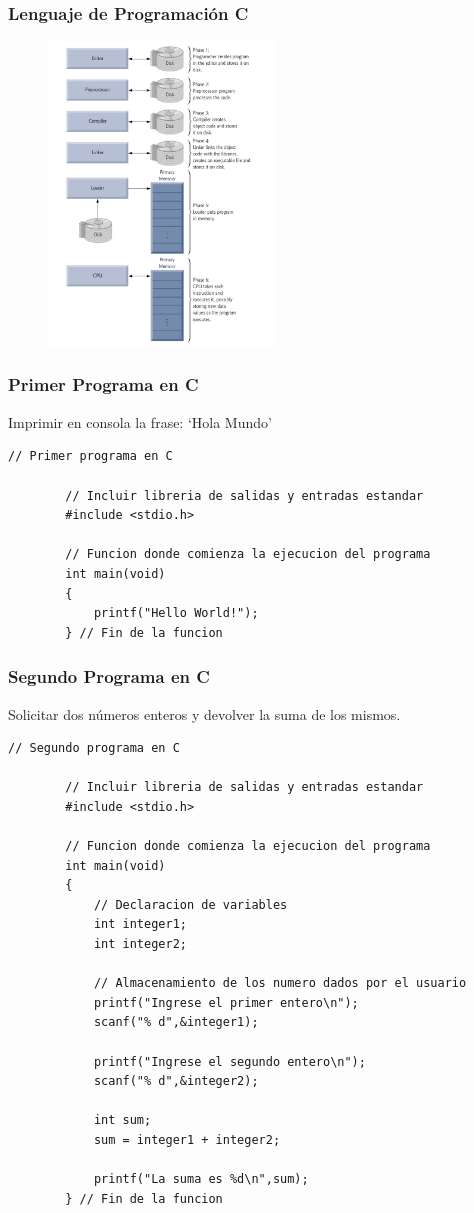 \documentclass[10.5pt,scale=1.0,t,aspectratio=169,hyperref={pdfpagelabels=false}]{beamer}
\begin{document}
\begin{frame}
	\frametitle{Lenguaje de Programación C}
	\begin{figure}
		\centering
		\includegraphics[width=6cm]{ProgramacionCEstructura}
	\end{figure}
\end{frame}
\begin{frame}[fragile]
	\frametitle{Primer Programa en C}
	
	Imprimir en consola la frase: `Hola Mundo'
	
	\begin{lstlisting}[style=CStyle]
		// Primer programa en C
		
		// Incluir libreria de salidas y entradas estandar
		#include <stdio.h>
		
		// Funcion donde comienza la ejecucion del programa
		int main(void)
		{
			printf("Hello World!"); 
		} // Fin de la funcion
	\end{lstlisting}
	
\end{frame}
\begin{frame}[fragile]
	\frametitle{Segundo Programa en C}
	
	Solicitar dos números enteros y devolver la suma de los mismos. 
	
	\begin{lstlisting}[style=CStyle]
		// Segundo programa en C
		
		// Incluir libreria de salidas y entradas estandar
		#include <stdio.h>
		
		// Funcion donde comienza la ejecucion del programa
		int main(void)
		{
			// Declaracion de variables
			int integer1;
			int integer2;
			
			// Almacenamiento de los numero dados por el usuario
			printf("Ingrese el primer entero\n");
			scanf("% d",&integer1);
			
			printf("Ingrese el segundo entero\n");
			scanf("% d",&integer2);
			
			int sum;
			sum = integer1 + integer2;
	
			printf("La suma es %d\n",sum); 
		} // Fin de la funcion
	\end{lstlisting}
\end{frame}
\end{document}
